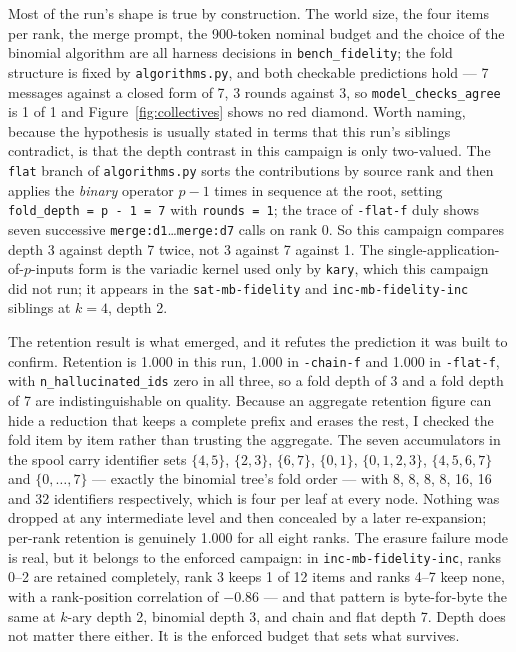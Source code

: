 \documentclass[11pt]{article}
\begin{document}
Most of the run's shape is true by construction. The world size, the four items per
rank, the merge prompt, the 900-token nominal budget and the choice of the binomial
algorithm are all harness decisions in \texttt{bench\_fidelity}; the fold structure is
fixed by \texttt{algorithms.py}, and both checkable predictions hold --- 7 messages
against a closed form of 7, 3 rounds against 3, so \texttt{model\_checks\_agree} is 1
of 1 and Figure~\ref{fig:collectives} shows no red diamond. Worth naming, because the
hypothesis is usually stated in terms that this run's siblings contradict, is that the
depth contrast in this campaign is only two-valued. The \texttt{flat} branch of
\texttt{algorithms.py} sorts the contributions by source rank and then applies the
\emph{binary} operator $p-1$ times in sequence at the root, setting
\texttt{fold\_depth = p - 1 = 7} with \texttt{rounds = 1}; the trace of
\texttt{-flat-f} duly shows seven successive \texttt{merge:d1}\dots\texttt{merge:d7}
calls on rank 0. So this campaign compares depth 3 against depth 7 twice, not 3 against
7 against 1. The single-application-of-$p$-inputs form is the variadic kernel used only
by \texttt{kary}, which this campaign did not run; it appears in the
\texttt{sat-mb-fidelity} and \texttt{inc-mb-fidelity-inc} siblings at $k = 4$, depth 2.

The retention result is what emerged, and it refutes the prediction it was built to
confirm. Retention is 1.000 in this run, 1.000 in \texttt{-chain-f} and 1.000 in
\texttt{-flat-f}, with \texttt{n\_hallucinated\_ids} zero in all three, so a fold depth
of 3 and a fold depth of 7 are indistinguishable on quality. Because an aggregate
retention figure can hide a reduction that keeps a complete prefix and erases the rest,
I checked the fold item by item rather than trusting the aggregate. The seven
accumulators in the spool carry identifier sets $\{4,5\}$, $\{2,3\}$, $\{6,7\}$,
$\{0,1\}$, $\{0,1,2,3\}$, $\{4,5,6,7\}$ and $\{0,\dots,7\}$ --- exactly the binomial
tree's fold order --- with 8, 8, 8, 8, 16, 16 and 32 identifiers respectively, which is
four per leaf at every node. Nothing was dropped at any intermediate level and then
concealed by a later re-expansion; per-rank retention is genuinely 1.000 for all eight
ranks. The erasure failure mode is real, but it belongs to the enforced campaign: in
\texttt{inc-mb-fidelity-inc}, ranks 0--2 are retained completely, rank 3 keeps 1 of 12
items and ranks 4--7 keep none, with a rank-position correlation of $-0.86$ --- and
that pattern is byte-for-byte the same at $k$-ary depth 2, binomial depth 3, and chain
and flat depth 7. Depth does not matter there either. It is the enforced budget that
sets what survives.
\end{document}
